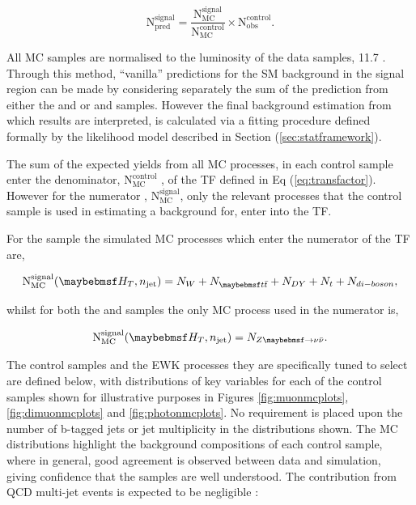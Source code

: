 \begin{equation}
\label{eq:transfactor}
\text{N}_{\text{pred}}^{\text{signal}} = \frac{\text{N}_{\text{MC}}^{\text{signal}}}{ \text{N}_{\text{MC}}^{\text{control}}} \times  \text{N}_{\text{obs}}^{\text{control}}.
\end{equation}

All MC samples are normalised to the luminosity of the data samples, 11.7 \fb. Through this method, ``vanilla'' predictions for the \ac{SM} background in the signal region can be made by considering separately the sum of the prediction from either the \mupjets and \gpjets or \mupjets and \dimupjets samples. However the final background estimation from which results are interpreted, is calculated via a fitting procedure defined formally by the likelihood model described in Section (\ref{sec:statframework}). 

The sum of the expected yields from all MC processes, in each control sample enter the denominator, $\text{N}_{\text{MC}}^{\text{control}}$  , of the \ac{TF} defined in Eq (\ref{eq:transfactor}). However for the numerator , $\text{N}_{\text{MC}}^{\text{signal}}$, only the relevant processes that the control sample is used in estimating a background for, enter into the \ac{TF}.

For the \mupjets sample the simulated MC processes which enter the numerator of the \ac{TF} are,

\begin{equation} 
\text{N}_{\text{MC}}^{\text{signal}}(\theht,n_{\text{jet}}) = N_{W} + N_{\ttbar} + N_{DY} + N_{t} + N_{di-boson},
\end{equation}

whilst for both the \dimupjets and \gpjets samples the only MC process used in the numerator is,

\begin{equation} 
\text{N}_{\text{MC}}^{\text{signal}}(\theht,n_{\text{jet}}) = N_{\zinv}.
\end{equation}

The control samples and the \ac{EWK} processes they are specifically tuned to select are defined below, with distributions of key variables for each of the control samples shown for illustrative purposes in Figures \ref{fig:muonmcplots}, \ref{fig:dimuonmcplots} and \ref{fig:photonmcplots}. No requirement is placed upon the number of b-tagged jets or jet multiplicity in the distributions shown. The MC distributions highlight the background compositions of each control sample, where in general, good agreement is observed between data and simulation, giving confidence that the samples are well understood. The contribution from QCD multi-jet events is expected to be negligible : 

